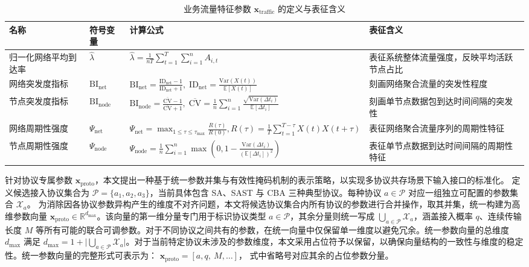 \begin{table}[t]
\centering
\caption{业务流量特征参数 $\mathbf{x}_{\text{traffic}}$ 的定义与表征含义}
\label{tab:traffic_feature_def}
\renewcommand{\arraystretch}{1.25}
\small
\begin{tabular}{p{2.6cm} p{1.6cm} p{6.2cm} p{4.2cm}}
\toprule
\textbf{名称} & \textbf{符号变量} & \textbf{计算公式} & \textbf{表征含义} \\
\midrule

归一化网络平均到达率 
& $\hat{\lambda}$ 
& $\hat{\lambda}=\frac{1}{nT}\!\sum_{t=1}^{T}\sum_{i=1}^{n}A_{i,t}$ 
& 表征系统整体流量强度，反映平均活跃节点占比 \\
\midrule

网络突发度指标 
& $\mathrm{BI}_{\mathrm{net}}$ 
& $\mathrm{BI}_{\mathrm{net}}
=\frac{\mathrm{ID}_{\mathrm{net}}-1}{\mathrm{ID}_{\mathrm{net}}+1},\;
\mathrm{ID}_{\mathrm{net}}
=\frac{\mathrm{Var}(X(t))}{\mathbb{E}[X(t)]}$ 
& 刻画网络聚合流量的突发性程度 \\
\midrule

节点突发度指标 
& $\mathrm{BI}_{\mathrm{node}}$ 
& $\mathrm{BI}_{\mathrm{node}}
=\frac{\overline{\mathrm{CV}}-1}{\overline{\mathrm{CV}}+1},\;
\overline{\mathrm{CV}}
=\frac{1}{n}\sum_{i=1}^{n}
\frac{\sqrt{\mathrm{Var}(\Delta t_i)}}{\mathbb{E}[\Delta t_i]}$ 
& 刻画单节点数据包到达时间间隔的突发性 \\
\midrule

网络周期性强度 
& $\Psi_{\mathrm{net}}$ 
& $\Psi_{\mathrm{net}}
=\max_{1\le\tau\le\tau_{\max}}
\frac{R(\tau)}{R(0)},
R(\tau)
=\frac{1}{T}\sum_{t=1}^{T-\tau}
X(t)X(t+\tau)$ 
& 表征网络聚合流量序列的周期性特征 \\
\midrule

节点周期性强度 
& $\Psi_{\mathrm{node}}$ 
& $\Psi_{\mathrm{node}}
=\frac{1}{n}\sum_{i=1}^{n}
\max\!\left(0,1-
\frac{\mathrm{Var}(\Delta t_i)}
{(\mathbb{E}[\Delta t_i])^{2}}\right)$ 
& 表征单节点数据到达时间间隔的周期性特征 \\
\bottomrule

\end{tabular}
\end{table}


针对协议专属参数 $\mathbf{x}_{\mathrm{proto}}$，本文提出一种基于统一参数并集与有效性掩码机制的表示策略，以实现多协议共存场景下输入接口的标准化。
定义候选接入协议集合为 $\mathcal{P} = \{a_1, a_2, a_3\}$，当前具体包含 SA、SAST 与 CBA 三种典型协议。每种协议 $a \in \mathcal{P}$ 对应一组独立可配置的参数集合 $\mathcal{X}_a$。
为消除因各协议参数异构产生的维度不对齐问题，本文将候选协议集合内所有协议的参数进行合并操作，取其并集，统一构建为高维参数向量 $\mathbf{x}_{\mathrm{proto}} \in \mathbb{R}^{d_{\max}}$。该向量的第一维分量专门用于标识协议类型 $a \in \mathcal{P}$，其余分量则统一写成 $\bigcup_{a \in \mathcal{P}} \mathcal{X}_a$，涵盖接入概率 $q$、连续传输长度 $M$ 等所有可能的联合可调参数。对于不同协议之间共有的参数，在统一向量中仅保留单一维度以避免冗余。统一参数向量的总维度 $d_{\max}$ 满足 $d_{\max} = 1 + \big|\bigcup_{a \in \mathcal{P}} \mathcal{X}_a\big|$。对于当前特定协议未涉及的参数维度，本文采用占位符予以保留，以确保向量结构的一致性与维度的稳定性。统一参数向量的完整形式可表示为：
$\mathbf{x}_{\mathrm{proto}} = [a, q,\ M, \ldots]$，
式中省略号对应其余的占位参数分量。

